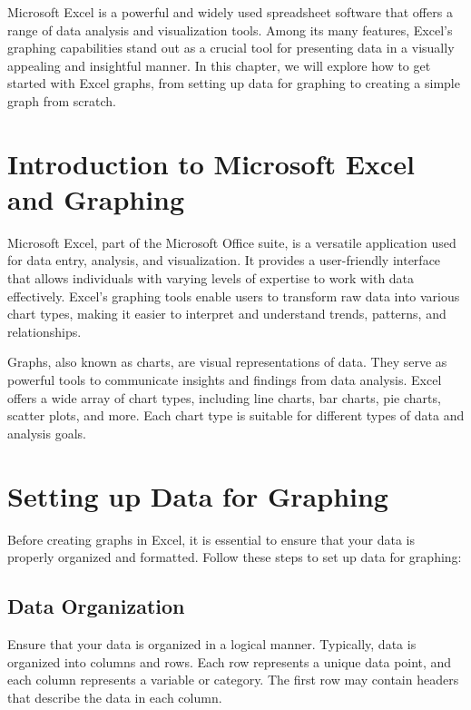 \documentclass[
]{book}
\begin{document}
Microsoft Excel is a powerful and widely used spreadsheet software that offers a range of data analysis and visualization tools. Among its many features, Excel's graphing capabilities stand out as a crucial tool for presenting data in a visually appealing and insightful manner. In this chapter, we will explore how to get started with Excel graphs, from setting up data for graphing to creating a simple graph from scratch.

\hypertarget{introduction-to-microsoft-excel-and-graphing}{%
\section{Introduction to Microsoft Excel and Graphing}\label{introduction-to-microsoft-excel-and-graphing}}

Microsoft Excel, part of the Microsoft Office suite, is a versatile application used for data entry, analysis, and visualization. It provides a user-friendly interface that allows individuals with varying levels of expertise to work with data effectively. Excel's graphing tools enable users to transform raw data into various chart types, making it easier to interpret and understand trends, patterns, and relationships.

Graphs, also known as charts, are visual representations of data. They serve as powerful tools to communicate insights and findings from data analysis. Excel offers a wide array of chart types, including line charts, bar charts, pie charts, scatter plots, and more. Each chart type is suitable for different types of data and analysis goals.

\hypertarget{setting-up-data-for-graphing}{%
\section{Setting up Data for Graphing}\label{setting-up-data-for-graphing}}

Before creating graphs in Excel, it is essential to ensure that your data is properly organized and formatted. Follow these steps to set up data for graphing:

\hypertarget{data-organization}{%
\subsection{Data Organization}\label{data-organization}}

Ensure that your data is organized in a logical manner. Typically, data is organized into columns and rows. Each row represents a unique data point, and each column represents a variable or category. The first row may contain headers that describe the data in each column.
\end{document}
